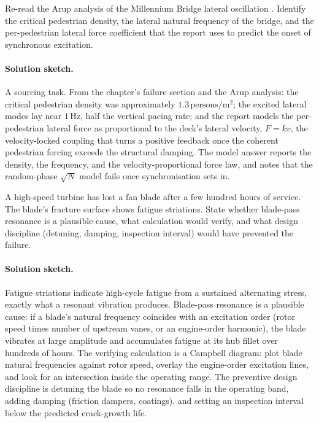 \begin{exercise}
Re-read the Arup analysis of the Millennium Bridge lateral
oscillation \cite{acc:dallard-millennium-2001}. Identify the
critical pedestrian density, the lateral natural frequency of the
bridge, and the per-pedestrian lateral force coefficient that the
report uses to predict the onset of synchronous excitation.

\paragraph{Solution sketch.} A sourcing task. From the chapter's
failure section and the Arup analysis: the critical pedestrian density
was approximately $1.3\,\text{persons}/\si{\meter\squared}$; the
excited lateral modes lay near $1\,\si{\hertz}$, half the vertical
pacing rate; and the report models the per-pedestrian lateral force as
proportional to the deck's lateral velocity, $F = k v$, the
velocity-locked coupling that turns a positive feedback once the
coherent pedestrian forcing exceeds the structural damping. The model
answer reports the density, the frequency, and the velocity-proportional
force law, and notes that the random-phase $\sqrt{N}$ model fails once
synchronisation sets in.
\end{exercise}

\begin{exercise}
A high-speed turbine has lost a fan blade after a few hundred hours
of service. The blade's fracture surface shows fatigue striations.
State whether blade-pass resonance is a plausible cause, what
calculation would verify, and what design discipline (detuning,
damping, inspection interval) would have prevented the failure.

\paragraph{Solution sketch.} Fatigue striations indicate high-cycle
fatigue from a sustained alternating stress, exactly what a resonant
vibration produces. Blade-pass resonance is a plausible cause: if a
blade's natural frequency coincides with an excitation order (rotor
speed times number of upstream vanes, or an engine-order harmonic),
the blade vibrates at large amplitude and accumulates fatigue at its
hub fillet over hundreds of hours. The verifying calculation is a
Campbell diagram: plot blade natural frequencies against rotor speed,
overlay the engine-order excitation lines, and look for an
intersection inside the operating range. The preventive design
discipline is detuning the blade so no resonance falls in the
operating band, adding damping (friction dampers, coatings), and
setting an inspection interval below the predicted crack-growth life.
\end{exercise}

